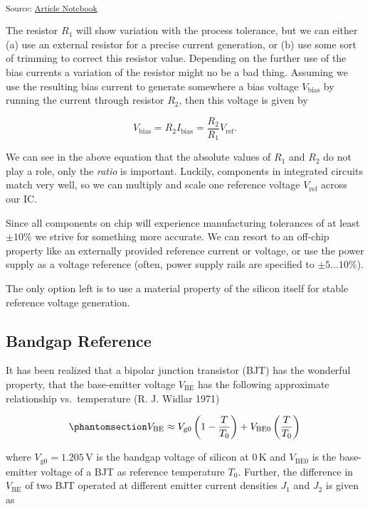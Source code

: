 \documentclass[
  a4paper,
  DIV=11,
  numbers=noendperiod]{scrartcl}
\begin{document}
\textsubscript{Source:
\href{https://iic-jku.github.io/analog-circuit-design/index.qmd.html}{Article
Notebook}}

The resistor \(R_1\) will show variation with the process tolerance, but
we can either (a) use an external resistor for a precise current
generation, or (b) use some sort of trimming to correct this resistor
value. Depending on the further use of the bias currents a variation of
the resistor might no be a bad thing. Assuming we use the resulting bias
current to generate somewhere a bias voltage \(V_\mathrm{bias}\) by
running the current through resistor \(R_2\), then this voltage is given
by

\[
V_\mathrm{bias} = R_2 I_\mathrm{bias} = \frac{R_2}{R_1} V_\mathrm{ref}.
\]

We can see in the above equation that the absolute values of \(R_1\) and
\(R_2\) do not play a role, only the \emph{ratio} is important. Luckily,
components in integrated circuits match very well, so we can multiply
and scale one reference voltage \(V_\mathrm{ref}\) across our IC.

Since all components on chip will experience manufacturing tolerances of
at least \(\pm 10\%\) we strive for something more accurate. We can
resort to an off-chip property like an externally provided reference
current or voltage, or use the power supply as a voltage reference
(often, power supply rails are specified to \(\pm 5 \ldots 10\%\)).

The only option left is to use a material property of the silicon itself
for stable reference voltage generation.

\subsection{Bandgap Reference}\label{bandgap-reference}

It has been realized that a bipolar junction transistor (BJT) has the
wonderful property, that the base-emitter voltage \(V_\mathrm{BE}\) has
the following approximate relationship vs.~temperature (R. J. Widlar
1971)

\begin{equation}\phantomsection\label{eq-vbe-vs-temp}{
V_\mathrm{BE}\approx V_\mathrm{g0} \left( 1 - \frac{T}{T_0} \right) + V_\mathrm{BE0} \left( \frac{T}{T_0} \right)
}\end{equation}

where \(V_\mathrm{g0} = 1.205\,\text{V}\) is the bandgap voltage of
silicon at \(0\,\text{K}\) and \(V_\mathrm{BE0}\) is the base-emitter
voltage of a BJT as reference temperature \(T_0\). Further, the
difference in \(V_\mathrm{BE}\) of two BJT operated at different emitter
current densities \(J_1\) and \(J_2\) is given as
\end{document}
